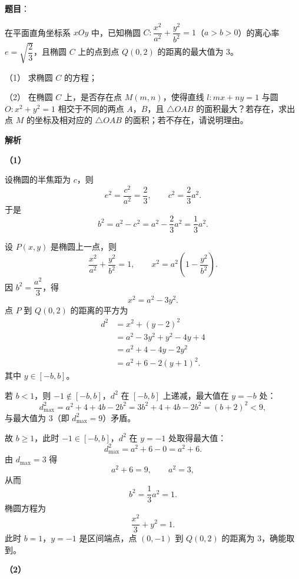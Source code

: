 \begin{answer}

\textbf{题目}：

在平面直角坐标系 $xOy$ 中，已知椭圆 $C:\dfrac{x^2}{a^2}+\dfrac{y^2}{b^2}=1$（$a>b>0$）的离心率 $e=\sqrt{\dfrac23}$，且椭圆 $C$ 上的点到点 $Q(0,2)$ 的距离的最大值为 $3$。

（1） 求椭圆 $C$ 的方程；

（2） 在椭圆 $C$ 上，是否存在点 $M(m,n)$，使得直线 $l:mx+ny=1$ 与圆 $O:x^2+y^2=1$ 相交于不同的两点 $A$，$B$，且 $\triangle OAB$ 的面积最大？若存在，求出点 $M$ 的坐标及相对应的 $\triangle OAB$ 的面积；若不存在，请说明理由。

\textbf{解析}

\textbf{（1）}

设椭圆的半焦距为 $c$，则
\nopagebreak[4]
\[e^2=\frac{c^2}{a^2}=\frac23,\qquad c^2=\frac23a^2.\]
于是
\nopagebreak[4]
\[b^2=a^2-c^2=a^2-\frac23a^2=\frac13a^2.\]

设 $P(x,y)$ 是椭圆上一点，则
\nopagebreak[4]
\[\frac{x^2}{a^2}+\frac{y^2}{b^2}=1,\qquad
x^2=a^2\left(1-\frac{y^2}{b^2}\right).\]
因 $b^2=\dfrac{a^2}3$，得
\nopagebreak[4]
\[x^2=a^2-3y^2.\]
点 $P$ 到 $Q(0,2)$ 的距离的平方为
\nopagebreak[4]
\[\begin{aligned}
d^2&=x^2+(y-2)^2\\
&=a^2-3y^2+y^2-4y+4\\
&=a^2+4-4y-2y^2\\
&=a^2+6-2(y+1)^2.
\end{aligned}\]
其中 $y\in[-b,b]$。

若 $b<1$，则 $-1\notin[-b,b]$，$d^2$ 在 $[-b,b]$ 上递减，最大值在 $y=-b$ 处：
\nopagebreak[4]
\[d^2_{\max}=a^2+4+4b-2b^2=3b^2+4+4b-2b^2=(b+2)^2<9,\]
与最大值为 $3$（即 $d^2_{\max}=9$）矛盾。

故 $b\geqslant1$，此时 $-1\in[-b,b]$，$d^2$ 在 $y=-1$ 处取得最大值：
\nopagebreak[4]
\[d^2_{\max}=a^2+6-0=a^2+6.\]
由 $d_{\max}=3$ 得
\nopagebreak[4]
\[a^2+6=9,\qquad a^2=3,\]
从而
\nopagebreak[4]
\[b^2=\frac13a^2=1.\]
椭圆方程为
\nopagebreak[4]
\[\frac{x^2}3+y^2=1.\]
此时 $b=1$，$y=-1$ 是区间端点，点 $(0,-1)$ 到 $Q(0,2)$ 的距离为 $3$，确能取到。

\textbf{（2）}


\end{answer}
